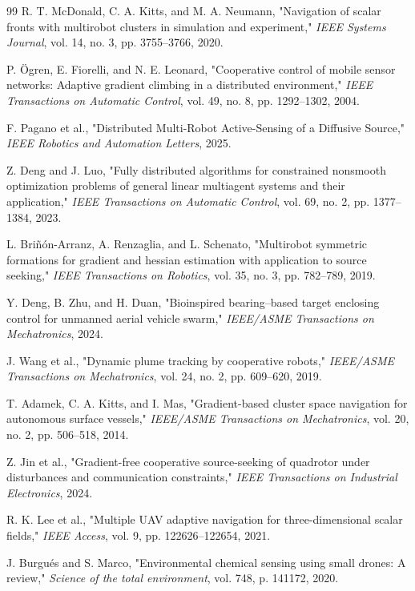 \documentclass[lettersize,journal]{IEEEtran}
\begin{document}
\begin{thebibliography}{99}
 R. T. McDonald, C. A. Kitts, and M. A. Neumann, "Navigation of scalar fronts with multirobot clusters in simulation and experiment," \textit{IEEE Systems Journal}, vol. 14, no. 3, pp. 3755--3766, 2020.

 P. Ögren, E. Fiorelli, and N. E. Leonard, "Cooperative control of mobile sensor networks: Adaptive gradient climbing in a distributed environment," \textit{IEEE Transactions on Automatic Control}, vol. 49, no. 8, pp. 1292--1302, 2004.

 F. Pagano et al., "Distributed Multi-Robot Active-Sensing of a Diffusive Source," \textit{IEEE Robotics and Automation Letters}, 2025.

 Z. Deng and J. Luo, "Fully distributed algorithms for constrained nonsmooth optimization problems of general linear multiagent systems and their application," \textit{IEEE Transactions on Automatic Control}, vol. 69, no. 2, pp. 1377--1384, 2023.

 L. Briñón-Arranz, A. Renzaglia, and L. Schenato, "Multirobot symmetric formations for gradient and hessian estimation with application to source seeking," \textit{IEEE Transactions on Robotics}, vol. 35, no. 3, pp. 782--789, 2019.

 Y. Deng, B. Zhu, and H. Duan, "Bioinspired bearing–based target enclosing control for unmanned aerial vehicle swarm," \textit{IEEE/ASME Transactions on Mechatronics}, 2024.

 J. Wang et al., "Dynamic plume tracking by cooperative robots," \textit{IEEE/ASME Transactions on Mechatronics}, vol. 24, no. 2, pp. 609--620, 2019.

 T. Adamek, C. A. Kitts, and I. Mas, "Gradient-based cluster space navigation for autonomous surface vessels," \textit{IEEE/ASME Transactions on Mechatronics}, vol. 20, no. 2, pp. 506--518, 2014.

 Z. Jin et al., "Gradient-free cooperative source-seeking of quadrotor under disturbances and communication constraints," \textit{IEEE Transactions on Industrial Electronics}, 2024.

 R. K. Lee et al., "Multiple UAV adaptive navigation for three-dimensional scalar fields," \textit{IEEE Access}, vol. 9, pp. 122626--122654, 2021.

 J. Burgués and S. Marco, "Environmental chemical sensing using small drones: A review," \textit{Science of the total environment}, vol. 748, p. 141172, 2020.


\end{thebibliography}
\end{document}
